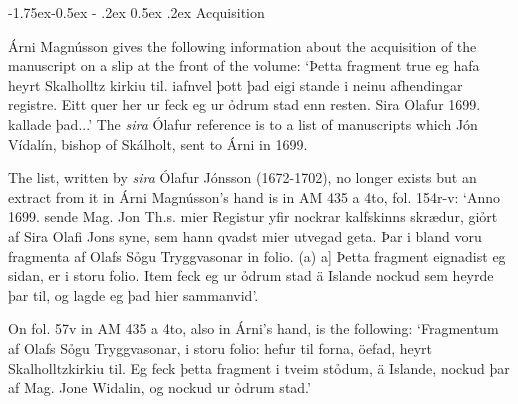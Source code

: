 \documentclass[11pt,twoside]{article}\makeatletter
\makeatletter
\def\ref{}
\renewcommand\subsection{\@startsection{subsection}{2}{\z@}%
     {-1.75ex\@plus -0.5ex \@minus- .2ex}%
     {0.5ex \@plus .2ex}%
     {\reset@font\Large\sffamily}}
\makeatother
\begin{document}
\subsection{Acquisition}
\par
Árni Magnússon gives the following information about the acquisition of the manuscript on a slip at the front of the volume: ‘Þetta fragment true eg hafa {\hskip1pt}\newline  heyrt Skalholltz kirkiu til. {\hskip1pt}\newline  iafnvel þott þad eigi stande {\hskip1pt}\newline  i neinu afhendingar registre. {\hskip1pt}\newline  Eitt quer her ur feck eg ur ỏd{\hskip1pt}\newline rum stad enn resten. {\hskip1pt}\newline  Sira Olafur 1699. kallade þad...’ The \textit{sira} Ólafur reference is to a list of manuscripts which Jón Vídalín, bishop of Skálholt, sent to Árni in 1699. \par
The list, written by \textit{sira} Ólafur Jónsson (1672-1702), no longer exists but an extract from it in Árni Magnússon's hand is in {\ref AM 435 a 4to}, fol. 154r-v: ‘Anno 1699. sende Mag. Jon Th.s. {\hskip1pt}\newline  mier Registur yfir nockrar kalf{\hskip1pt}\newline skinns skrædur, giỏrt af Sira Olafi Jons {\hskip1pt}\newline  syne, sem hann qvadst mier ut{\hskip1pt}\newline vegad geta. Þar i bland voru {\hskip1pt}\newline  fragmenta af Olafs Sỏgu Tryggva{\hskip1pt}\newline sonar in folio. (a)  a] Þetta fragment eignadist eg sidan, er i {\hskip1pt}\newline  storu folio. Item feck eg ur ỏdrum {\hskip1pt}\newline  stad ä Islande nockud sem heyrde þar {\hskip1pt}\newline  til, og lagde eg þad hier sammanvid’. \par
On fol. 57v in AM 435 a 4to, also in Árni's hand, is the following: ‘Fragmentum af Olafs Sỏgu Tryggvasonar, i storu folio: hefur til forna, öefad, heyrt Skalholltzkirkiu til. Eg feck þetta fragment i tveim stỏdum, ä Islande, nockud þar af Mag. Jone Widalin, og nockud ur ỏdrum stad.’ \par
\end{document}
